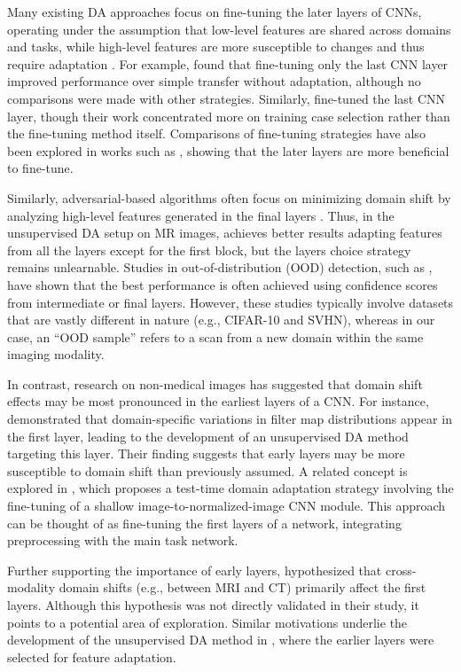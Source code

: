Many existing DA approaches focus on fine-tuning the later layers of CNNs, operating under the assumption that low-level features are shared across domains and tasks, while high-level features are more susceptible to changes and thus require adaptation \cite{yosinski2014transferable}. For example, \cite{kushibar2019supervised} found that fine-tuning only the last CNN layer improved performance over simple transfer without adaptation, although no comparisons were made with other strategies. Similarly, \cite{valindria2018domain} fine-tuned the last CNN layer, though their work concentrated more on training case selection rather than the fine-tuning method itself. Comparisons of fine-tuning strategies have also been explored in works such as \cite{valverde2019one,ghafoorian2017transfer}, showing that the later layers are more beneficial to fine-tune.

Similarly, adversarial-based algorithms often focus on minimizing domain shift by analyzing high-level features generated in the final layers \cite{dann}. Thus, in the unsupervised DA setup on MR images, \cite{dann_medim} achieves better results adapting features from all the layers except for the first block, but the layers choice strategy remains unlearnable. Studies in out-of-distribution (OOD) detection, such as \cite{lee2018simple,erdil2020unsupervised}, have shown that the best performance is often achieved using confidence scores from intermediate or final layers. However, these studies typically involve datasets that are vastly different in nature (e.g., CIFAR-10 and SVHN), whereas in our case, an ``OOD sample'' refers to a scan from a new domain within the same imaging modality.

In contrast, research on non-medical images has suggested that domain shift effects may be most pronounced in the earliest layers of a CNN. For instance, \cite{aljundi2016lightweight} demonstrated that domain-specific variations in filter map distributions appear in the first layer, leading to the development of an unsupervised DA method targeting this layer. Their finding suggests that early layers may be more susceptible to domain shift than previously assumed. A related concept is explored in \cite{karani2021test}, which proposes a test-time domain adaptation strategy involving the fine-tuning of a shallow image-to-normalized-image CNN module. This approach can be thought of as fine-tuning the first layers of a network, integrating preprocessing with the main task network.

Further supporting the importance of early layers, \cite{dou2018unsupervised} hypothesized that cross-modality domain shifts (e.g., between MRI and CT) primarily affect the first layers. Although this hypothesis was not directly validated in their study, it points to a potential area of exploration. Similar motivations underlie the development of the unsupervised DA method in \cite{zhao2021robust}, where the earlier layers were selected for feature adaptation.

